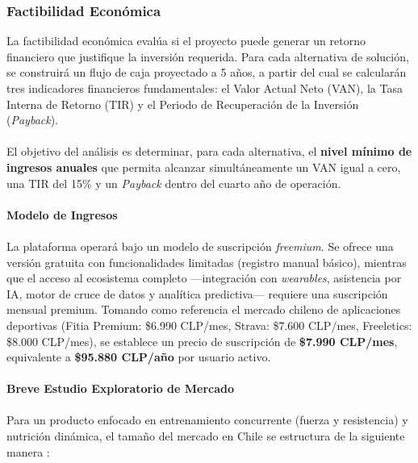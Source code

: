 \documentclass[12pt]{article}
\begin{document}
\subsubsection{Factibilidad Económica}
La factibilidad económica evalúa si el proyecto puede generar un retorno financiero que justifique la inversión requerida. Para cada alternativa de solución, se construirá un flujo de caja proyectado a 5 años, a partir del cual se calcularán tres indicadores financieros fundamentales: el Valor Actual Neto (VAN), la Tasa Interna de Retorno (TIR) y el Periodo de Recuperación de la Inversión (\textit{Payback}).
\\\\
El objetivo del análisis es determinar, para cada alternativa, el \textbf{nivel mínimo de ingresos anuales} que permita alcanzar simultáneamente un VAN igual a cero, una TIR del 15\% y un \textit{Payback} dentro del cuarto año de operación.
\\\\
\textbf{Modelo de Ingresos}
\\\\
La plataforma operará bajo un modelo de suscripción \textit{freemium}. Se ofrece una versión gratuita con funcionalidades limitadas (registro manual básico), mientras que el acceso al ecosistema completo ---integración con \textit{wearables}, asistencia por IA, motor de cruce de datos y analítica predictiva--- requiere una suscripción mensual premium. Tomando como referencia el mercado chileno de aplicaciones deportivas (Fitia Premium: \$6.990 CLP/mes, Strava: \$7.600 CLP/mes, Freeletics: \$8.000 CLP/mes), se establece un precio de suscripción de \textbf{\$7.990 CLP/mes}, equivalente a \textbf{\$95.880 CLP/año} por usuario activo.
\\\\ 
\textbf{Breve Estudio Exploratorio de Mercado}
\\\\
Para un producto enfocado en entrenamiento concurrente (fuerza y resistencia) y nutrición dinámica, el tamaño del mercado en Chile se estructura de la siguiente manera \citep{mindep_habitos}:
\end{document}
